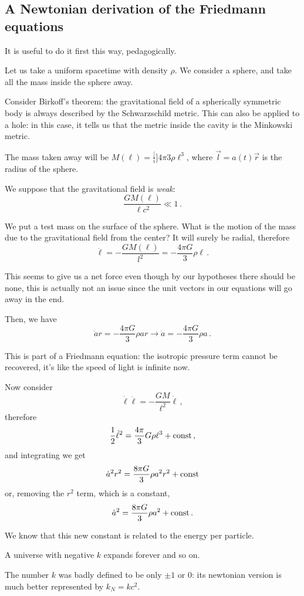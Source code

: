\documentclass[main.tex]{subfiles}
\begin{document}
\subsection{A Newtonian derivation of the Friedmann equations}

It is useful to do it first this way, pedagogically.

Let us take a uniform spacetime with density \(\rho\). We consider a sphere, and take all the mass inside the sphere away.

Consider Birkoff's theorem: the gravitational field of a spherically symmetric body is always described by the Schwarzschild metric.
This can also be applied to a hole: in this case, it tells us that the metric inside the cavity is the Minkowski metric.

The mass taken away will be \(M(\ell) = \frac[i]{4 \pi}{3} \rho \ell^{3}\), where \(\vec{l} = a(t) \vec{r}\) is the radius of the sphere.

We suppose that the gravitational field is \emph{weak}:
\begin{equation}
  \frac{GM(\ell)}{\ell c^2} \ll 1\,.
\end{equation}

We put a test mass on the surface of the sphere. What is the motion of the mass due to the gravitational field from the center? It will surely be radial, therefore
\begin{equation}
  \ddot{\ell} = - \frac{GM(\ell)}{l^2} = - \frac{4 \pi G}{3} \rho \ell\,.
\end{equation}

This seems to give us a net force even though by our hypotheses there should be none, this is actually not an issue since the unit vectors in our equations will go away in the end.

Then, we have
\begin{equation}
  \ddot{a} r = - \frac{4 \pi G}{3} \rho a r
  \to
  \ddot{a} = - \frac{4 \pi G}{3} \rho a\,.
\end{equation}

This is part of a Friedmann equation: the isotropic pressure term cannot be recovered, it's like the speed of light is infinite now.

Now consider 
\begin{equation}
  \dot{\ell} \ddot{\ell} = - \frac{GM}{\ell^2} \dot{\ell}\,,
\end{equation}
%
therefore 
%
\begin{equation}
  \frac{1}{2}\dot{\ell}^2 = \frac{4 \pi}{3} G \rho \ell^{3} + \const\,,
\end{equation}
%
and integrating we get
%
\begin{equation}
  \dot{a}^2 r^2 = \frac{8 \pi G}{3} \rho a^2 r^2 + \const
\end{equation}
%
or, removing the \(r^2\) term, which is a constant,
%
\begin{equation}
    \dot{a}^2 = \frac{8 \pi G}{3} \rho a^2 + \const\,.
\end{equation}

We know that this new constant is related to the energy per particle. 

A universe with negative \(k\) expands forever and so on.

The number \(k\) was badly defined to be only \(\pm 1\) or 0: its newtonian version is much better represented by \(k_N = kc^2\).
\end{document}
